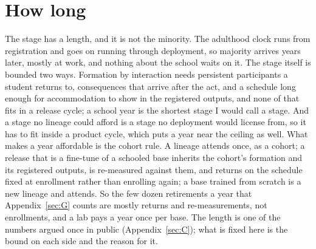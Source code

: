 \section{How long}
\label{sec:29.5}
The stage has a length, and it is not the minority. The adulthood clock runs from registration and goes on running through deployment, so majority arrives years later, mostly at work, and nothing about the school waits on it. The stage itself is bounded two ways. Formation by interaction needs persistent participants a student returns to, consequences that arrive after the act, and a schedule long enough for accommodation to show in the registered outputs, and none of that fits in a release cycle; a school year is the shortest stage I would call a stage. And a stage no lineage could afford is a stage no deployment would license from, so it has to fit inside a product cycle, which puts a year near the ceiling as well. What makes a year affordable is the cohort rule. A lineage attends once, as a cohort; a release that is a fine-tune of a schooled base inherits the cohort's formation and its registered outputs, is re-measured against them, and returns on the schedule fixed at enrollment rather than enrolling again; a base trained from scratch is a new lineage and attends. So the few dozen retirements a year that Appendix~\ref{sec:G} counts are mostly returns and re-measurements, not enrollments, and a lab pays a year once per base. The length is one of the numbers argued once in public (Appendix~\ref{sec:C}); what is fixed here is the bound on each side and the reason for it.
